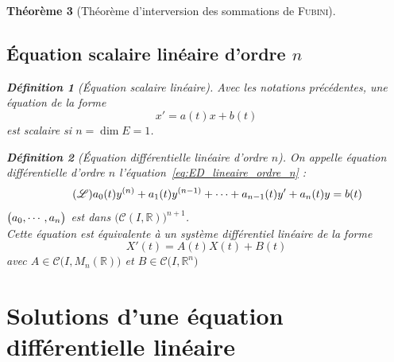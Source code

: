 \documentclass[11pt,a4paper]{report}
\newtheorem{theorem}{Théorème}[chapter]
\theoremstyle{definition}
\newtheorem{dfn}[theorem]{Définition}
\begin{document}
\begin{theorem}[Théorème d'interversion des sommations de \textsc{Fubini}]
{{\subsection{Équation scalaire linéaire d'ordre $n$} %
\label{sub:equation_scalaire_lineaire_d_ordre_n}
\begin{dfn}[Équation scalaire linéaire]
     Avec les notations précédentes, une équation de la forme
     \begin{equation}
     x' = a(t)x + b(t)
     \end{equation}
     est scalaire si $n=\dim E = 1$.
\end{dfn}
\begin{dfn}[Équation différentielle linéaire d'ordre $n$]
On appelle \emph{équation différentielle d'ordre $n$} l'équation~\eqref{eq:ED_lineaire_ordre_n} :
\begin{equation}\tag{\ensuremath{\mathscr{L}}}\label{eq:ED_lineaire_ordre_n}
a_0(t)y^{(n)}+a_1(t) y^{(n-1)}+\cdots + a_{n-1}(t) y' + a_n(t) y = b(t)
\end{equation}
$\left( \vphantom{3^3} a_0,\cdots ,a_n \right)$ est dans $\Big( \mathcal{C}(I,\ensuremath{\mathbb{R}})\Big)^{n+1} $. \\
Cette équation est équivalente à un système différentiel linéaire de la forme 
    $$ X'(t) = A(t)X(t) + B(t) $$ 
avec $A\in \mathcal{C}\Big( I,M_n (\ensuremath{\mathbb{R}})\Big) $ et $B \in \mathcal{C}\big( I,\ensuremath{\mathbb{R}}^n\big) $
\end{dfn}


\section{Solutions d'une équation différentielle linéaire} %
\label{sec:solutions_d_une_equation_differentielle_lineaire}
}}
\end{theorem}
\end{document}
